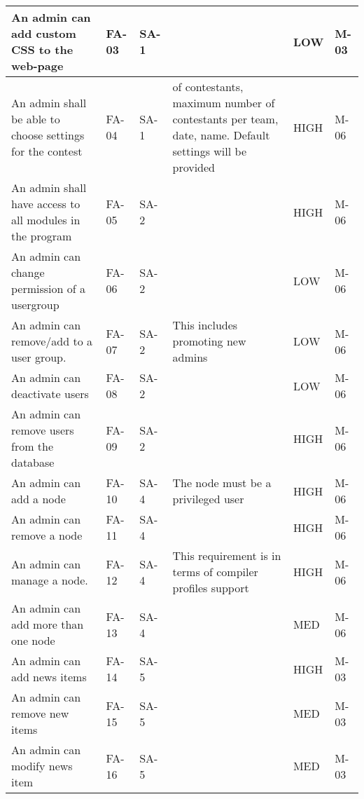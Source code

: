 \begin{longtable}{|p{4cm}|l|l|p{4cm}|l|l|}
An admin can add custom CSS to the web-page & FA-03 & SA-1 & & LOW & M-03 \\
\hline

An admin shall be able to choose settings for the contest & FA-04 & SA-1 & of
contestants, maximum number of contestants per team, date, name.  Default
settings will be provided & HIGH & M-06 \\
\hline

An admin shall have access to all modules in the program & FA-05 & SA-2 & &
HIGH & M-06 \\ 
\hline

An admin can change permission of a usergroup & FA-06 & SA-2 & & LOW & M-06 \\
\hline

An admin can remove/add to a user group. & FA-07 & SA-2 & This
includes promoting new admins & LOW & M-06 \\ 
\hline 

An admin can deactivate users & FA-08 & SA-2 & & LOW & M-06 \\ 
\hline

An admin can remove users from the database & FA-09 & SA-2 && HIGH & M-06 \\ 
\hline

An admin can add a node & FA-10 & SA-4 & The node must be a privileged
user & HIGH & M-06 \\ 
\hline 

An admin can remove a node & FA-11 & SA-4 & & HIGH & M-06 \\ 
\hline 

An admin can manage a node. & FA-12 & SA-4 & This requirement is in terms of
compiler profiles support & HIGH & M-06 \\ 
\hline 

An admin can add more than one node & FA-13 & SA-4 & & MED & M-06 \\ 
\hline 

An admin can add news items & FA-14 & SA-5 & & HIGH & M-03 \\ 
\hline

An admin can remove new items & FA-15 & SA-5 & & MED & M-03 \\ 
\hline 

An admin can modify news item & FA-16 & SA-5 & & MED & M-03 \\ 
\hline 
\end{longtable}


